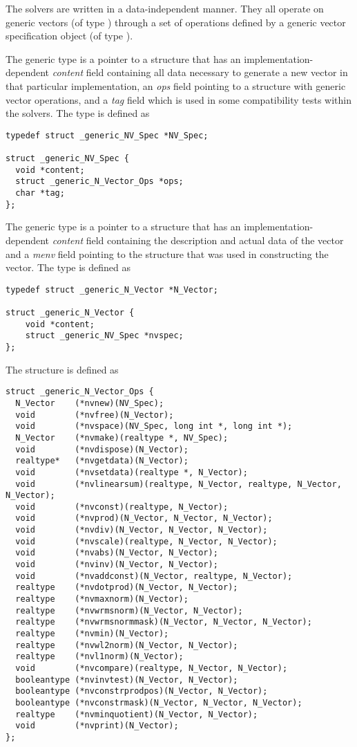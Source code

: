 %
The {\sundials} solvers are written in a data-independent manner. 
They all operate on generic vectors (of type ) through a set of
operations defined by a generic vector specification object (of type ).

The generic  type is a pointer to a structure that has an
implementation-dependent {\em content} field containing
all data necessary to generate a new vector in that particular
implementation, an {\em ops} field pointing to a structure with
generic vector operations, and a {\em tag} field which is used
in some compatibility tests within the {\sundials} solvers. 
The type  is defined as
\begin{verbatim}
typedef struct _generic_NV_Spec *NV_Spec;

struct _generic_NV_Spec {
  void *content;
  struct _generic_N_Vector_Ops *ops;
  char *tag;
};
\end{verbatim}

The generic  type is a pointer to a structure that has an 
implementation-dependent {\em content} field containing the 
description and actual data of the vector and a {\em menv} field 
pointing to the  structure that was used in constructing the
vector.
The type  is defined as
\begin{verbatim}
typedef struct _generic_N_Vector *N_Vector;

struct _generic_N_Vector {
    void *content;
    struct _generic_NV_Spec *nvspec;
};
\end{verbatim}

The  structure is defined as
\begin{verbatim}
struct _generic_N_Vector_Ops {
  N_Vector    (*nvnew)(NV_Spec);
  void        (*nvfree)(N_Vector);
  void        (*nvspace)(NV_Spec, long int *, long int *);
  N_Vector    (*nvmake)(realtype *, NV_Spec);
  void        (*nvdispose)(N_Vector);
  realtype*   (*nvgetdata)(N_Vector);
  void        (*nvsetdata)(realtype *, N_Vector);
  void        (*nvlinearsum)(realtype, N_Vector, realtype, N_Vector, N_Vector); 
  void        (*nvconst)(realtype, N_Vector);
  void        (*nvprod)(N_Vector, N_Vector, N_Vector);
  void        (*nvdiv)(N_Vector, N_Vector, N_Vector);
  void        (*nvscale)(realtype, N_Vector, N_Vector);
  void        (*nvabs)(N_Vector, N_Vector);
  void        (*nvinv)(N_Vector, N_Vector);
  void        (*nvaddconst)(N_Vector, realtype, N_Vector);
  realtype    (*nvdotprod)(N_Vector, N_Vector);
  realtype    (*nvmaxnorm)(N_Vector);
  realtype    (*nvwrmsnorm)(N_Vector, N_Vector);
  realtype    (*nvwrmsnormmask)(N_Vector, N_Vector, N_Vector);
  realtype    (*nvmin)(N_Vector);
  realtype    (*nvwl2norm)(N_Vector, N_Vector);
  realtype    (*nvl1norm)(N_Vector);
  void        (*nvcompare)(realtype, N_Vector, N_Vector);
  booleantype (*nvinvtest)(N_Vector, N_Vector);
  booleantype (*nvconstrprodpos)(N_Vector, N_Vector);
  booleantype (*nvconstrmask)(N_Vector, N_Vector, N_Vector);
  realtype    (*nvminquotient)(N_Vector, N_Vector);
  void        (*nvprint)(N_Vector);
};
\end{verbatim}

